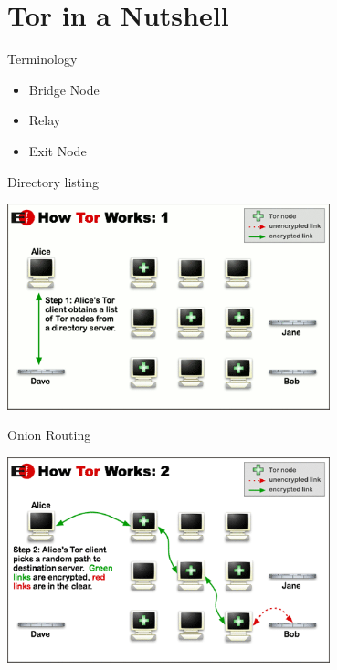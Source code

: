 \documentclass{beamer}
\begin{document}
\section{Tor in a Nutshell}
	\begin{frame}{Terminology}	
		\begin{itemize}
			\item Bridge Node
			\item Relay
			\item Exit Node
		\end{itemize}
	\end{frame}
	\begin{frame}{Directory listing}
		\begin{center}
			\includegraphics[width=0.7\textwidth]{htw1.png}
		\end{center}
	\end{frame}
	\begin{frame}{Onion Routing}
		\begin{center}
			\includegraphics[width=0.7\textwidth]{htw2.png}
		\end{center}
	\end{frame}
\end{document}
